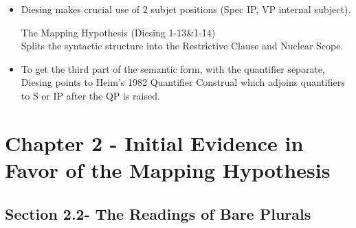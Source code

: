 \documentclass[landscape]{article}
\begin{document}
\begin{itemize}
\begin{example}
\begin{tabular}{|l||c|c|}
\end{tabular}
\end{example}


\item Diesing makes crucial use of 2 subjet positions (Spec IP, VP internal subject).


\begin{example}The Mapping Hypothesis (Diesing 1-13\&1-14)\\
Splits the syntactic structure into the  Restrictive Clause and Nuclear Scope.\\
\end{example}

\item To get the third part of the semantic form, with the quantifier separate,  Diesing points to Heim's 1982 Quantifier Construal which adjoins quantifiers to S or IP after the QP is raised.

\end{itemize}

\section{Chapter 2 - Initial Evidence in Favor of the Mapping Hypothesis}

\subsection*{Section 2.2- The Readings of Bare Plurals }

\end{document}
